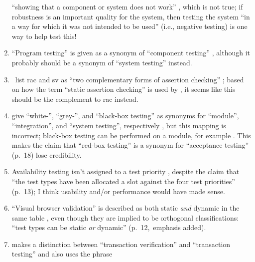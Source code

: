 \begin{enumerate}
            ``showing that a component or system does not work''
            \citeyearpar[p.~46]{Kam2008} , which is not true;
            if robustness is an important quality for the system, then testing
            the system ``in a way for which it was not intended to be used''
            \citepISTQB{} (i.e., negative testing) is one way to help
            test this!
      \item ``Program testing'' is given as a synonym of ``component testing''
            \citep[p.~46]{Kam2008}, although it probably should be a synonym of
            ``system testing'' instead.
      \item \citeauthor{ChalinEtAl2006}~list \acf{rac} and \acf{sv} as ``two
            complementary forms of assertion checking''
            \citeyearpar[p.~343]{ChalinEtAl2006}; based on how the term ``static
            assertion checking'' is used by \citet[p.~345]{LahiriEtAl2013}, it
            seems like this should be the complement to \acs{rac} instead.
      \item \citeauthor{SneedAndGöschl2000} give ``white-'', ``grey-'', and
            ``black-box testing'' as synonyms for ``module'', ``integration'',
            and ``system testing'', respectively
            \citeyearpar[p.~18]{SneedAndGöschl2000} , but
            this mapping is incorrect; black-box testing can be performed on a
            module, for example . This makes the claim that
            ``red-box testing'' is a synonym for ``acceptance testing'' (p.~18)
            lose credibility.
      \item Availability testing isn't assigned to a test priority
            \citep[Tab.~2]{Gerrard2000a}, despite the claim that ``the test
            types have been allocated a slot against
            the four test priorities'' (p.~13); I think usability and/or
            performance would have made sense.
      \item ``Visual browser validation'' is described as both static \emph{and}
            dynamic in the same table \citep[Tab.~2]{Gerrard2000a}, even though
            they are implied to be orthogonal classifications: ``test
            types can be static \emph{or} dynamic'' (p.~12,~emphasis added).
      \item \citeauthor{Gerrard2000a} makes a distinction between ``transaction
            verification'' and ``transaction testing''
            \citeyearpar[Tab.~2]{Gerrard2000a} and also uses the phrase

\end{enumerate}
